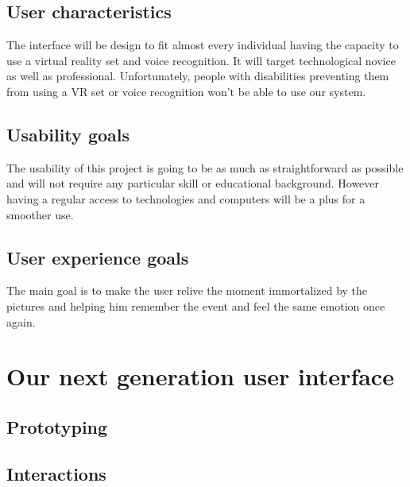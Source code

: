\documentclass[11pt,a4paper]{article}
\begin{document}
\subsection{User characteristics}
The interface will be design to fit almost every individual having the capacity to use a virtual reality set and voice recognition. It will target technological novice as well as professional. Unfortunately, people with disabilities preventing them from using a VR set or voice recognition won't be able to use our system.

\subsection{Usability goals}

The usability of this project is going to be as much as straightforward as possible and will not require any particular skill or educational background. However having a regular access to technologies and computers will be a plus for a smoother use. 

\subsection{User experience goals}

The main goal is to make the user relive the moment immortalized by the pictures and helping him remember the event and feel the same emotion once again.

\section{Our next generation user interface}
\subsection{Prototyping}



\subsection{Interactions}

\end{document}
